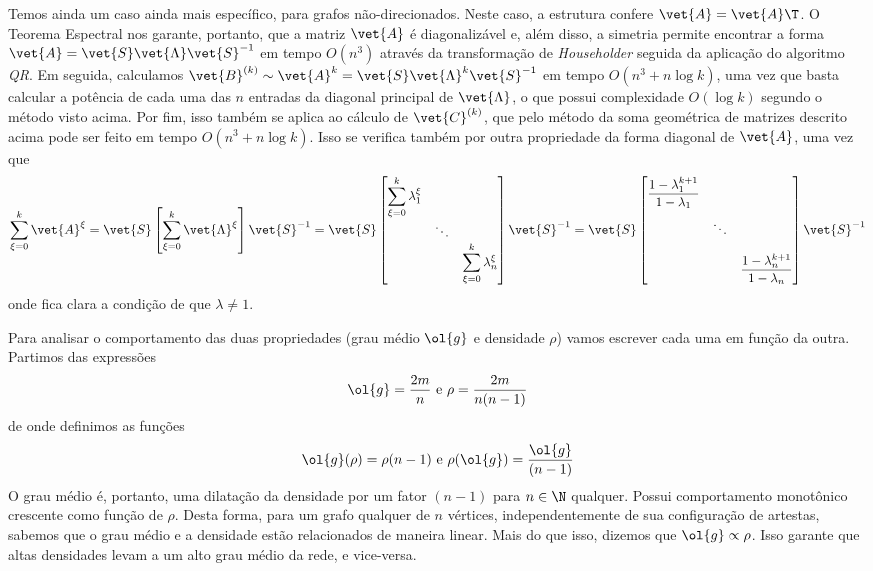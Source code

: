 \documentclass[l15, tikzdraw]{homework}
\begin{document}
	Temos ainda um caso ainda mais específico, para grafos não-direcionados. Neste caso, a estrutura confere $\vet{A} = \vet{A}\T$. O Teorema Espectral nos garante, portanto, que a matriz $\vet{A}$ é diagonalizável e, além disso, a simetria permite encontrar a forma $\vet{A} = \vet{S} \vet{\Lambda} \vet{S}^{-1}$ em tempo $O(n^3)$ através da transformação de \textit{Householder} seguida da aplicação do algoritmo \textit{QR}. Em seguida, calculamos $\vet{B}^{(k)} \sim \vet{A}^k = \vet{S} \vet{\Lambda}^k \vet{S}^{-1}$ em tempo $O(n^3 + n \log k)$, uma vez que basta calcular a potência de cada uma das $n$ entradas da diagonal principal de $\vet{\Lambda}$, o que possui complexidade $O(\log k)$ segundo o método visto acima. Por fim, isso também se aplica ao cálculo de $\vet{C}^{(k)}$, que pelo método da soma geométrica de matrizes descrito acima pode ser feito em tempo $O(n^3 + n \log k)$. Isso se verifica também por outra propriedade da forma diagonal de $\vet{A}$, uma vez que
		$$\sum_{\xi = 0}^{k} \vet{A}^\xi = \vet{S} \left[ \sum_{\xi = 0}^{k} \vet{\Lambda}^\xi \right]\vet{S}^{-1} = \vet{S} \left[ \begin{matrix}%
			\displaystyle \sum_{\xi = 0}^{k} \lambda_1^\xi & ~ & ~ \\
			~ & \ddots & ~ \\
			~ & ~ & \displaystyle \sum_{\xi = 0}^{k} \lambda_n^\xi%
		\end{matrix} \right]\vet{S}^{-1} = \vet{S} \left[ \begin{matrix}%
			\displaystyle \frac{1 - \lambda_1^{k + 1}}{1 - \lambda_1} & ~ & ~ \\[2.5ex]
			~ & \ddots & ~ \\[2.5ex]
			~ & ~ & \displaystyle \frac{1 - \lambda_n^{k + 1}}{1 - \lambda_n}%
		\end{matrix} \right]\vet{S}^{-1}$$
	onde fica clara a condição de que $\lambda \neq 1$.


	Para analisar o comportamento das duas propriedades (grau médio $\ol{g}$ e densidade $\rho$) vamos escrever cada uma em função da outra. Partimos das expressões
		$$\ol{g} = \frac{2m}{n} \text{ e } \rho = \frac{2m}{n (n - 1)}$$
	de onde definimos as funções
		$$\ol{g}(\rho) = \rho (n - 1) \text{ e } \rho(\ol{g})= \frac{\ol{g}}{(n - 1)}$$
	O grau médio é, portanto, uma dilatação da densidade por um fator $(n - 1)$ para $n \in \N$ qualquer. Possui comportamento monotônico crescente como função de $\rho$. Desta forma, para um grafo qualquer de $n$ vértices, independentemente de sua configuração de artestas, sabemos que o grau médio e a densidade estão relacionados de maneira linear. Mais do que isso, dizemos que $\ol{g} \propto \rho$. Isso garante que altas densidades levam a um alto grau médio da rede, e vice-versa. 
		
\end{document}
